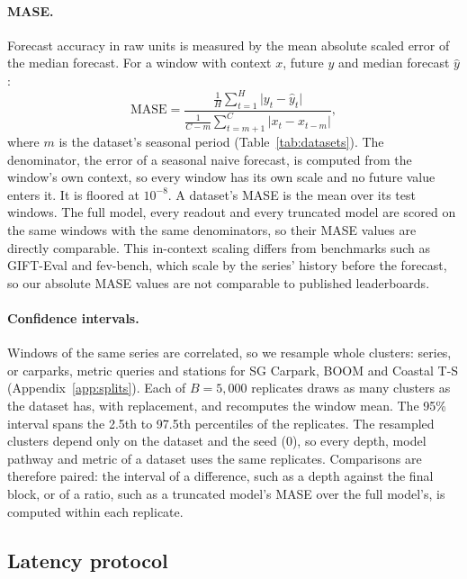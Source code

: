 \documentclass{article} %
\begin{document}
\paragraph{MASE.} Forecast accuracy in raw units is measured by the mean absolute scaled error
\citep{HYNDMAN2006679} of the median forecast. For a window with context $x$, future $y$ and
median forecast $\hat y$:
\begin{equation}
\mathrm{MASE}=\frac{\frac{1}{H}\sum_{t=1}^{H}\lvert y_t-\hat y_t\rvert}
{\frac{1}{C-m}\sum_{t=m+1}^{C}\lvert x_t-x_{t-m}\rvert},
\label{eq:mase}
\end{equation}
where $m$ is the dataset's seasonal period (Table~\ref{tab:datasets}). The denominator, the error
of a seasonal naive forecast, is computed from the window's own context, so every window has its
own scale and no future value enters it. It is floored at $10^{-8}$. A dataset's MASE is the mean
over its test windows. The full model, every readout and every truncated model are scored on the
same windows with the same denominators, so their MASE values are directly comparable. This
in-context scaling differs from benchmarks such as GIFT-Eval and fev-bench, which scale by the
series' history before the forecast, so our absolute MASE values are not comparable to published
leaderboards.

\paragraph{Confidence intervals.} Windows of the same series are correlated, so we resample whole
clusters: series, or carparks, metric queries and stations for SG Carpark, BOOM and Coastal
T-S (Appendix~\ref{app:splits}). Each of $B=5{,}000$ replicates draws as many clusters as the
dataset has, with replacement, and recomputes the window mean. The 95\% interval spans the 2.5th
to 97.5th percentiles of the replicates. The resampled clusters depend only on the dataset and
the seed (0), so every depth, model pathway and metric of a dataset uses the same replicates.
Comparisons are therefore paired: the interval of a difference, such as a depth against the final
block, or of a ratio, such as a truncated model's MASE over the full model's, is computed within
each replicate.

\subsection{Latency protocol}
\label{app:latency}
\end{document}
